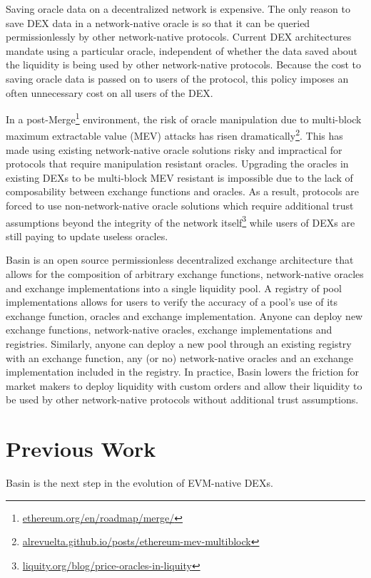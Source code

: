 \documentclass[tikz]{article}
\newcommand{\fref}[1]{\footnote{\href{http://#1}{#1}}}
\begin{document}
Saving oracle data on a decentralized network is expensive. The only reason to save DEX data in a network-native oracle is so that it can be queried permissionlessly by other network-native protocols. Current DEX architectures mandate using a particular oracle, independent of whether the data saved about the liquidity is being used by other network-native protocols. Because the cost to saving oracle data is passed on to users of the protocol, this policy imposes an often unnecessary cost on all users of the DEX. 

In a post-Merge\fref{ethereum.org/en/roadmap/merge/} environment, the risk of oracle manipulation due to multi-block maximum extractable value (MEV) attacks has risen dramatically\fref{alrevuelta.github.io/posts/ethereum-mev-multiblock}. This has made using existing network-native oracle solutions risky and impractical for protocols that require manipulation resistant oracles. Upgrading the oracles in existing DEXs to be multi-block MEV resistant is impossible due to the lack of composability between exchange functions and oracles. As a result, protocols are forced to use non-network-native oracle solutions which require additional trust assumptions beyond the integrity of the network itself\fref{liquity.org/blog/price-oracles-in-liquity} while users of DEXs are still paying to update useless oracles.

Basin is an open source permissionless decentralized exchange architecture that allows for the composition of arbitrary exchange functions, network-native oracles and exchange implementations into a single liquidity pool. A registry of pool implementations allows for users to verify the accuracy of a pool's use of its exchange function, oracles and exchange implementation. Anyone can deploy new exchange functions, network-native oracles, exchange implementations and registries. Similarly, anyone can deploy a new pool through an existing registry with an exchange function, any (or no) network-native oracles and an exchange implementation included in the registry. In practice, Basin lowers the friction for market makers to deploy liquidity with custom orders and allow their liquidity to be used by other network-native protocols without additional trust assumptions.

\section{Previous Work}
Basin is the next step in the evolution of EVM-native DEXs.
\end{document}
